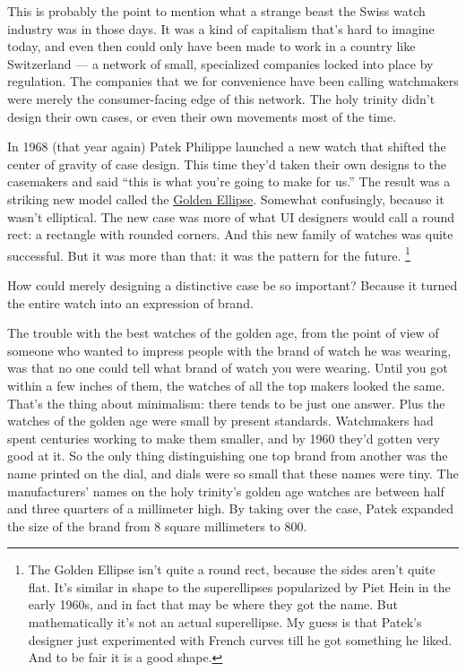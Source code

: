 This is probably the point to mention what a strange beast the Swiss
watch industry was in those days. It was a kind of capitalism that's
hard to imagine today, and even then could only have been made to work
in a country like Switzerland --- a network of small, specialized
companies locked into place by regulation. The companies that we for
convenience have been calling watchmakers were merely the
consumer-facing edge of this network. The holy trinity didn't design
their own cases, or even their own movements most of the time.

In 1968 (that year again) Patek Philippe launched a new watch that
shifted the center of gravity of case design. This time they'd taken
their own designs to the casemakers and said ``this is what you're going
to make for us.'' The result was a striking new model called the
\href{https://collectability.com/learn/the-history-of-the-golden-ellipse/}{Golden
Ellipse}. Somewhat confusingly, because it wasn't elliptical. The new
case was more of what UI designers would call a round rect: a rectangle
with rounded corners. And this new family of watches was quite
successful. But it was more than that: it was the pattern for the
future. \footnote{The Golden Ellipse isn't quite a round rect, because the sides
aren't quite flat. It's similar in shape to the superellipses
popularized by Piet Hein in the early 1960s, and in fact that may be
where they got the name. But mathematically it's not an actual
superellipse. My guess is that Patek's designer just experimented with
French curves till he got something he liked. And to be fair it is a
good shape.}

How could merely designing a distinctive case be so important? Because
it turned the entire watch into an expression of brand.

The trouble with the best watches of the golden age, from the point of
view of someone who wanted to impress people with the brand of watch he
was wearing, was that no one could tell what brand of watch you were
wearing. Until you got within a few inches of them, the watches of all
the top makers looked the same. That's the thing about minimalism: there
tends to be just one answer. Plus the watches of the golden age were
small by present standards. Watchmakers had spent centuries working to
make them smaller, and by 1960 they'd gotten very good at it. So the
only thing distinguishing one top brand from another was the name
printed on the dial, and dials were so small that these names were tiny.
The manufacturers' names on the holy trinity's golden age watches are
between half and three quarters of a millimeter high. By taking over the
case, Patek expanded the size of the brand from 8 square millimeters to
800.

